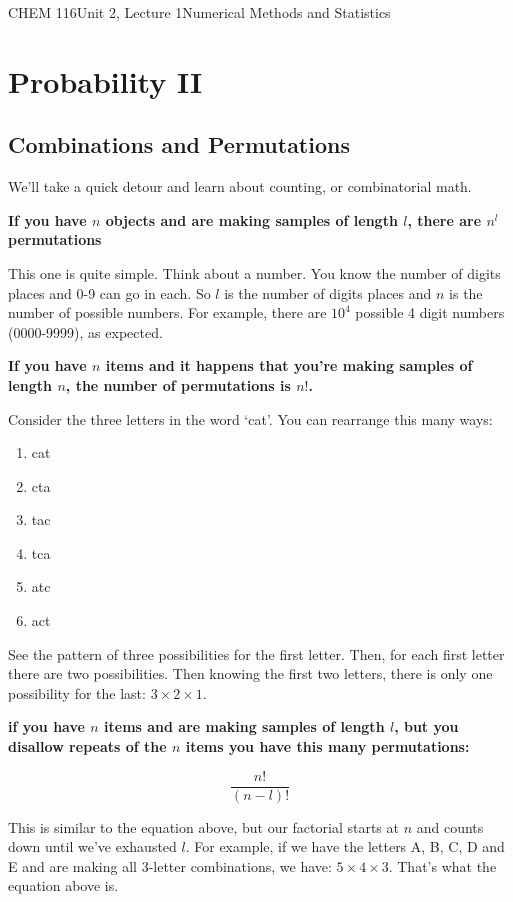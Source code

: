\documentclass{article}
\begin{document}
\begin{tdoc}{CHEM 116}{Unit 2, Lecture 1}{Numerical Methods and Statistics} 

  \section{Probability II}

  \subsection{Combinations and Permutations}

  We'll take a quick detour and learn about counting, or combinatorial math. 

  {\bf If you have $n$ objects and are making samples of length $l$, there are $n^l$ permutations}

  This one is quite simple. Think about a number. You know the number
  of digits places and 0-9 can go in each. So $l$ is the number of
  digits places and $n$ is the number of possible numbers. For example, there
  are $10^4$ possible 4 digit numbers (0000-9999), as expected. 
  
  {\bf  If you have $n$ items and it happens that you're making samples of length $n$, the number of permutations is $n!$. }

  Consider the three letters in the word `cat'. You can rearrange this many ways:

  \begin{enumerate}
  \item cat
  \item cta
  \item tac
  \item tca
  \item atc
  \item act        
  \end{enumerate}

  See the pattern of three possibilities for the first letter. Then,
  for each first letter there are two possibilities. Then knowing the
  first two letters, there is only one possibility for the last: $3 \times 2 \times 1$.

  {\bf if you have $n$ items and are making samples of length $l$, but you disallow repeats of the $n$ items you have this many permutations:}

  $$  \frac{n!}{(n - l)!}$$

  This is similar to the equation above, but our factorial starts at
  $n$ and counts down until we've exhausted $l$. For example, if we
  have the letters A, B, C, D and E and are making all 3-letter
  combinations, we have: $5 \times 4 \times 3$. That's what the
  equation above is. 


\end{tdoc}
\end{document}
